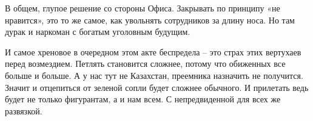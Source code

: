 В общем, глупое решение со стороны Офиса. Закрывать по принципу «не нравится»,
это то же самое, как увольнять сотрудников за длину носа. Но там дурак и
наркоман с богатым уголовным будущим.

И самое хреновое в очередном этом акте беспредела – это страх этих вертухаев
перед возмездием. Петлять становится сложнее, потому что обиженных все больше и
больше. А у нас тут не Казахстан, преемника назначить не получится. Значит и
отцепиться от зеленой сопли будет сложнее обычного. И прилетать ведь будет не
только фигурантам, а и нам всем. С непредвиденной для всех же развязкой.
